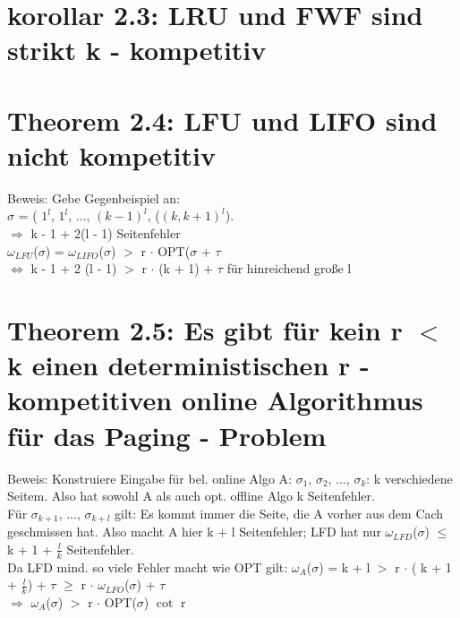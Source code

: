 \documentclass[a4paper]{article}
\begin{document}
\section*{korollar 2.3: LRU und FWF sind strikt k - kompetitiv}

\section*{Theorem 2.4: LFU und LIFO sind nicht kompetitiv}
Beweis: Gebe Gegenbeispiel an:\\
$\sigma$ = ( $1^l$, $1^l$, ..., $(k-1)^l$, ($(k, k+1)^l$). \\
$\Rightarrow$ k - 1 + 2(l - 1) Seitenfehler \\
$\omega_{LFU}$($\sigma$) = $\omega_{LIFO}$($\sigma$) $>$ r $\cdot$ OPT($\sigma$ + $\tau$ \\
$\Leftrightarrow$ k - 1 + 2 (l - 1) $>$ r $\cdot$ (k + 1) + $\tau$ für hinreichend große l

\section*{Theorem 2.5: Es gibt für kein r $<$ k einen deterministischen r - kompetitiven online Algorithmus für das Paging - Problem}
Beweis: Konstruiere Eingabe für bel. online Algo A: $\sigma_{1}$, $\sigma_{2}$, ..., $\sigma_{k}$: k verschiedene Seitem. Also hat sowohl A als auch opt. offline Algo k Seitenfehler.\\
Für $\sigma_{k + 1}$, ..., $\sigma_{k + l}$ gilt: Es kommt immer die Seite, die A vorher aus dem Cach geschmissen hat. Also macht A hier k + l Seitenfehler; LFD hat nur $\omega_{LFD}$($\sigma$) $\le$ k + 1 + $\tfrac{l}{k}$ Seitenfehler. \\
Da LFD mind. so viele Fehler macht wie OPT gilt: $\omega_{A}$($\sigma$) = k + l $>$ r $\cdot$ ( k + 1 + $\tfrac{l}{k}$) + $\tau$ $\ge$ r $\cdot$ $\omega_{LFO}$($\sigma$) + $\tau$ \\
 $\Rightarrow$  $\omega_{A}$($\sigma$) $>$ r $\cdot$ OPT($\sigma$) $\cot$ r
 
\end{document}
